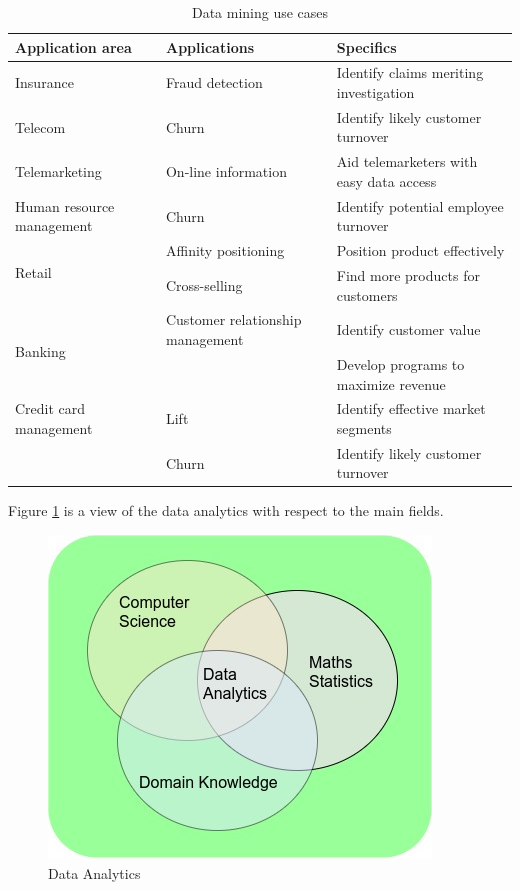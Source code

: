 \begin{table}[H]
	\centering
	\begin{tabular}{|p{4cm}|p{4cm}|l|}
		\hline
		\textbf{Application area} & \textbf{Applications} & \textbf{Specifics}\\
		\hline
		Insurance & Fraud detection & Identify claims meriting investigation\\
		\hline
		Telecom & Churn & Identify likely customer turnover\\
		\hline
		Telemarketing & On-line information & Aid telemarketers with easy data access\\
		\hline
		Human resource management & Churn & Identify potential employee turnover\\
		\hline
		\multirow{2}{4em}{Retail}  & Affinity positioning & Position product effectively\\
		& Cross-selling & Find more products for customers\\
		\hline
		\multirow{2}{4em}{Banking} & Customer relationship management & Identify customer value\\
		&& Develop programs to maximize revenue\\
		\hline
		Credit card management & Lift & Identify effective market segments\\
		& Churn & Identify likely customer turnover\\
		\hline
	\end{tabular}
	\caption{Data mining use cases}
	\label{tableDMusecase}
\end{table}
	
Figure \ref{fig:data-analytics} is a view of the data analytics with respect to the main fields.

\begin{figure}[H]
	\includegraphics[scale = 0.8]{figures/FlowChart.jpg}
	\centering
	\caption{Data Analytics}
	\label{fig:data-analytics}
\end{figure}

